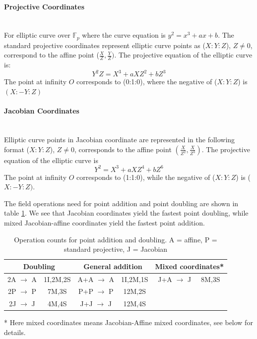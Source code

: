 \paragraph{Projective Coordinates} \mbox{}\\
For elliptic curve over $\mathbb{F}_p$ where the curve equation is $y^2=x^3+ax+b$. The standard projective coordinates represent elliptic curve points as ($X:Y:Z$), $Z \neq 0$, correspond to the affine point ($\frac{X}{Z},\frac{Y}{Z})$. The projective equation of the elliptic curve is: $$Y^2Z=X^3+aXZ^2+bZ^3$$ The point at infinity $O$ corresponds to (0:1:0), where the negative of ($X:Y:Z$) is $(X:-Y:Z)$ 
\paragraph{Jacobian Coordinates} \mbox{}\\
Elliptic curve points in Jacobian coordinate are represented in the following format ($X:Y:Z$), $Z \neq 0$, corresponds to the affine point $(\frac{X}{Z^2},\frac{X}{Z^3})$. The projective equation of the elliptic curve is $$ Y^2=X^3+aXZ^4+bZ^6$$ The point at infinity $O$ corresponds to (1:1:0), while the negative of ($X:Y:Z$) is ($X:-Y:Z)$.
 
The field operations need for point addition and point doubling are shown in table \ref{tb:APJacobian}. We see that Jacobian coordinates yield the fastest point doubling, while mixed Jacobian-affine coordinates yield the fastest point addition.

\begin{table}[h]
	\centering
	\caption{Operation counts for point addition and doubling. A = affine, P = standard projective, J = Jacobian \cite{hankerson2006guide,brown2001software}}
	\label{tb:APJacobian}
	\begin{tabular}{|cc|cc|ll|}
		\hline
		\multicolumn{2}{|c|}{Doubling} & \multicolumn{2}{c|}{General addition} & \multicolumn{2}{c|}{Mixed coordinates*} \\ \hline
		2A $\rightarrow$ A         & 1I,2M,2S        & A+A $\rightarrow$ A            & 1I,2M,1S           & \multicolumn{1}{c}{J+A $\rightarrow$ J}    & 8M,3S   \\
		2P $\rightarrow$ P         & 7M,3S           & P+P $\rightarrow$ P            & 12M,2S             &                              &         \\
		2J $\rightarrow$ J         & 4M,4S           & J+J $\rightarrow$ J            & 12M,4S             &                              &         \\ \hline
	\end{tabular} \par
	\bigskip
	* Here mixed coordinates means Jacobian-Affine mixed coordinates, see below for details.
\end{table}


